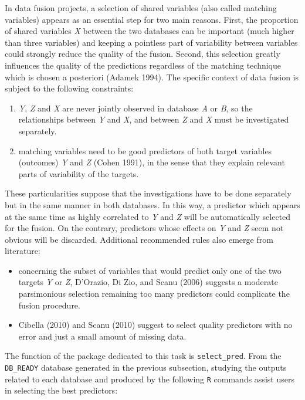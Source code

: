In data fusion projects, a selection of shared variables (also called matching variables) appears as an essential step for two main reasons. First, the proportion of shared variables \emph{X} between the two databases can be important (much higher than three variables) and keeping a pointless part of variability between variables could strongly reduce the quality of the fusion. Second, this selection greatly influences the quality of the predictions regardless of the matching technique which is chosen a posteriori (Adamek 1994). The specific context of data fusion is subject to the following constraints:

\begin{enumerate}
\def\labelenumi{\arabic{enumi}.}
\tightlist
\item
  \emph{Y}, \emph{Z} and \emph{X} are never jointly observed in database \emph{A} or \emph{B}, so the relationships between \emph{Y} and \emph{X}, and between \emph{Z} and \emph{X} must be investigated separately.
\item
  matching variables need to be good predictors of both target variables (outcomes) \emph{Y} and \emph{Z} (Cohen 1991), in the sense that they explain relevant parts of variability of the targets.
\end{enumerate}

These particularities suppose that the investigations have to be done separately but in the same manner in
both databases. In this way, a predictor which appears at the same time as highly correlated to \emph{Y} and \emph{Z} will be automatically selected for the fusion. On the contrary, predictors whose effects on \emph{Y} and \emph{Z} seem not obvious will be discarded. Additional recommended rules also emerge from literature:

\begin{itemize}
\tightlist
\item
  concerning the subset of variables that would predict only one of the two targets \emph{Y} or \emph{Z}, D'Orazio, Di Zio, and Scanu (2006) suggests a moderate parsimonious selection remaining too many predictors could complicate the fusion procedure.
\item
  Cibella (2010) and Scanu (2010) suggest to select quality predictors with no error and just a small amount of missing data.
\end{itemize}

The function of the package dedicated to this task is \texttt{select\_pred}. From the \texttt{DB\_READY} database
generated in the previous subsection, studying the outputs related to each database and produced by the following \texttt{R} commands assist users in selecting the best predictors:

